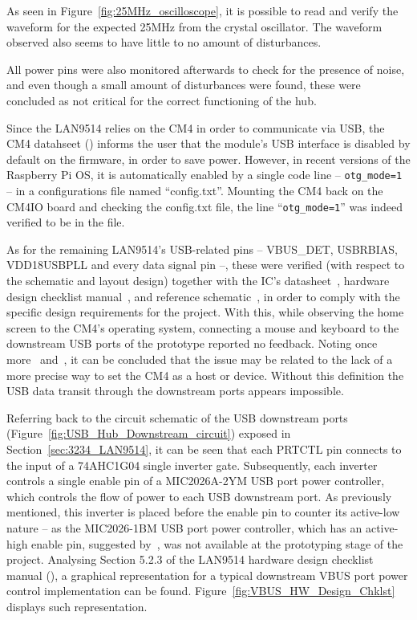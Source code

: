 As seen in Figure~\ref{fig:25MHz_oscilloscope}, it is possible to read and verify the waveform for the expected 25MHz from the crystal oscillator. The waveform observed also seems to have little to no amount of disturbances.

All power pins were also monitored afterwards to check for the presence of noise, and even though a small amount of disturbances were found, these were concluded as not critical for the correct functioning of the hub. 

Since the LAN9514 relies on the CM4 in order to communicate via USB, the CM4 datahseet (\cite{CM4}) informs the user that the module's USB interface is disabled by default on the firmware, in order to save power. However, in recent versions of the Raspberry Pi OS, it is automatically enabled by a single code line -- \verb!otg_mode=1! -- in a configurations file named ``config.txt''. Mounting the CM4 back on the CM4IO board and checking the config.txt file, the line ``\verb!otg_mode=1!'' was indeed verified to be in the file.

As for the remaining LAN9514's USB-related pins -- VBUS\_DET, USBRBIAS, VDD18USBPLL and every data signal pin --, these were verified (with respect to the schematic and layout design) together with the IC's datasheet~\cite{LAN9514}, hardware design checklist manual~\cite{LAN9514_HW_Design_Checklist}, and reference schematic~\cite{LAN9514_ref_schematic}, in order to comply with the specific design requirements for the project. With this, while observing the home screen to the CM4's operating system, connecting a mouse and keyboard to the downstream USB ports of the prototype reported no feedback. Noting once more~\cite{CM4} and~\cite{LAN9514}, it can be concluded that the issue may be related to the lack of a more precise way to set the CM4 as a host or device. Without this definition the USB data transit through the downstream ports appears impossible.

Referring back to the circuit schematic of the USB downstream ports (Figure~\ref{fig:USB_Hub_Downstream_circuit}) exposed in Section~\ref{sec:3234_LAN9514}, it can be seen that each PRTCTL pin connects to the input of a 74AHC1G04 single inverter gate. Subsequently, each inverter controls a single enable pin of a MIC2026A-2YM USB port power controller, which controls the flow of power to each USB downstream port. As previously mentioned, this inverter is placed before the enable pin to counter its active-low nature -- as the MIC2026-1BM USB port power controller, which has an active-high enable pin, suggested by~\cite{LAN9514_ref_schematic}, was not available at the prototyping stage of the project. Analysing Section 5.2.3 of the LAN9514 hardware design checklist manual (\cite{LAN9514_HW_Design_Checklist}), a graphical representation for a typical downstream VBUS port power control implementation can be found. Figure~\ref{fig:VBUS_HW_Design_Chklst} displays such representation.

